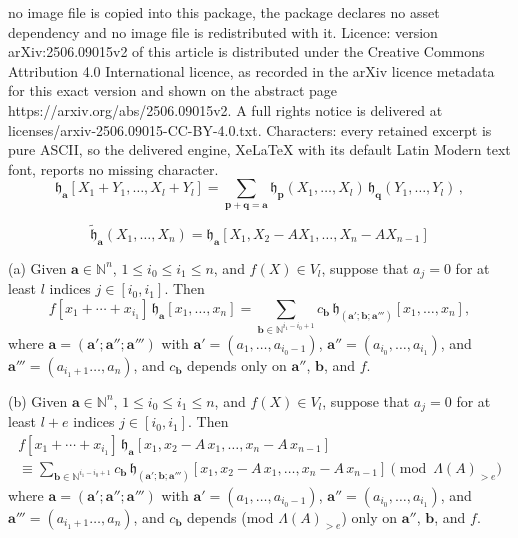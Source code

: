 \documentclass[10pt,a4paper]{amsart}
\newcommand{\NN}{{\mathbb N}}
\newcommand{\aA}{{\mathbf a}}
\newcommand{\bb}{{\mathbf b}}
\newcommand{\fh}{{\mathfrak h}}
\newcommand{\pp}{{\mathbf p}}
\newcommand{\qq}{{\mathbf q}}
\newcommand{\tfh}{{\widetilde{\mathfrak h}}}
\begin{document}
no image file is copied into this package, the package declares no asset dependency and no image file is redistributed with it. Licence: version arXiv:2506.09015v2 of this article is distributed under the Creative Commons Attribution 4.0 International licence, as recorded in the arXiv licence metadata for this exact version and shown on the abstract page https://arxiv.org/abs/2506.09015v2. A full rights notice is delivered at licenses/arxiv-2506.09015-CC-BY-4.0.txt. Characters: every retained excerpt is pure ASCII, so the delivered engine, XeLaTeX with its default Latin Modern text font, reports no missing character.
\begin{equation}
\label{e coprod formula} \fh_{\aA}[X_1+Y_1,\ldots,X_l+Y_l] = \sum_{\pp
+ \qq = \aA} \fh_{\pp}(X_1,\ldots,X_l)\,  \fh_{\qq}(Y_1,\ldots,Y_l) \,,
\end{equation}

\begin{equation}\label{e:htild}
\tfh_{\aA}(X_1,\ldots,X_n) = \fh_{\aA}[X_1,X_2-AX_1, \ldots,
X_n-AX_{n-1}]
\end{equation}

\begin{prop}\label{prop:symm-by-ha}
(a) Given $\aA \in \NN ^{n}$, $1\leq i_{0}\leq i_{1}\leq n$, and
$f(X)\in V_{l}$, suppose that $a_{j} = 0$ for at least $l$ indices
$j\in [i_{0},i_{1}]$.  Then
\begin{equation}\label{e:symm-by-ha}
f[x_{1}+\cdots +x_{i_{1}}] \, \fh_{\aA }[x_{1}, \ldots, x_{n}] = \sum
_{\bb \in \NN ^{i_{1}-i_{0}+1} }c_{\bb }\, \fh_{(\aA';\bb
;\aA''')}[x_{1}, \ldots, x_{n}],
\end{equation}
where $\aA = (\aA '; \aA ''; \aA ''')$ with $\aA' = (a_1,\ldots ,
a_{i_0-1})$, $\aA'' = (a_{i_0},\ldots , a_{i_1})$, and $\aA''' =
(a_{i_1+1}\ldots , a_{n})$, and $c_{\bb }$ depends only on $\aA ''$,
$\bb $, and $f$.

(b) Given $\aA \in \NN ^{n}$, $1\leq i_{0}\leq i_{1}\leq n$, and
$f(X)\in V_{l}$, suppose that $a_{j} = 0$ for at least $l+e$ indices
$j\in [i_{0},i_{1}]$.  Then
\begin{multline}\label{e:symm-by-ha-A}
f[x_{1}+\cdots +x_{i_{1}}] \, \fh_{\aA }[x_{1}, x_{2} - A\, x_{1},
\ldots, x_{n} - A\, x_{n-1}]\\
\equiv \sum _{\bb \in \NN ^{i_{1}-i_{0}+1} } c_{\bb }\, \fh_{(\aA';\bb
;\aA''')}[x_{1}, x_{2} - A\, x_{1}, \ldots, x_{n} - A\, x_{n-1}]
\pmod{\Lambda (A)_{>e}}
\end{multline}
where $\aA = (\aA '; \aA ''; \aA ''')$ with $\aA' = (a_1,\ldots ,
a_{i_0-1})$, $\aA'' = (a_{i_0},\ldots , a_{i_1})$, and $\aA''' =
(a_{i_1+1}\ldots , a_{n})$, and $c_{\bb }$ depends {\rm (mod $\Lambda
(A)_{>e}$)} only on $\aA ''$, $\bb $, and $f$.
\end{prop}
\end{document}
